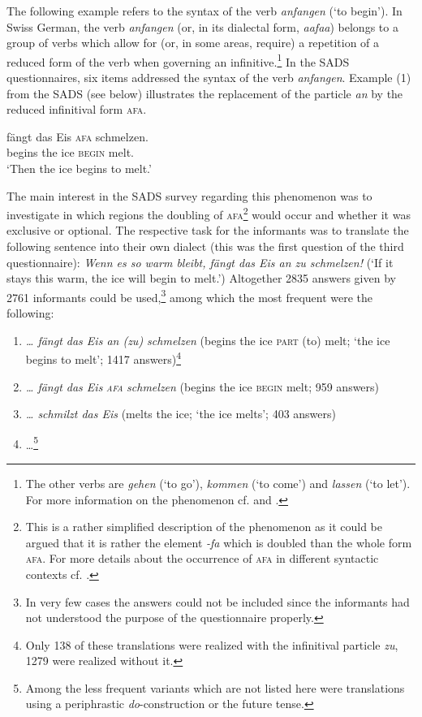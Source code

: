 \documentclass[output=paper]{LSP/langsci}
\begin{document}
The following example refers to the syntax of the verb \emph{anfangen} (‘to begin’). In Swiss German, the verb \emph{anfangen} (or, in its dialectal form, \emph{aafaa}) belongs to a group of verbs which allow for (or, in some areas, require) a repetition of a reduced form of the verb when governing an infinitive.\footnote{The other verbs are \emph{gehen} (‘to go’), \emph{kommen} (‘to come’) and \emph{lassen} (‘to let’). For more information on the phenomenon cf. \citet{glaser_empirische_2011} and \citet{lotscher_zur_1993}.} In the SADS questionnaires, six items addressed the syntax of the verb \emph{anfangen}. Example (1) from the SADS (see below) illustrates the replacement of the particle \emph{an} by the reduced infinitival form \textsc{afa}.

\ea %
\label{ex:stoeck:1}
\gll [dann]  fängt  das Eis  \textsc{afa} schmelzen.\\
[then]    begins  the ice    \textsc{begin}  melt.	\\
\glt `Then the ice begins to melt.'
\z

The main interest in the SADS survey regarding this phenomenon was to investigate in which regions the doubling of \textsc{afa}\footnote{ This is a rather simplified description of the phenomenon as it could be argued that it is rather the element \emph{{}-fa} which is doubled than the whole form \textsc{afa}. For more details about the occurrence of \textsc{afa} in different syntactic contexts cf. \citet{andres_verdoppelung_2011}.} would occur and whether it was exclusive or optional. The respective task for the informants was to translate the following sentence into their own dialect (this was the first question of the third questionnaire):
\vskip11pt
\emph{Wenn es so warm bleibt, fängt das Eis an zu schmelzen!} (‘If it stays this warm, the ice will begin to melt.’)
\vskip11pt
Altogether 2835 answers given by 2761 informants could be used,\footnote{In very few cases the answers could not be included since the informants had not understood the purpose of the questionnaire properly.} among which the most frequent were the following:

\begin{enumerate}
\item \emph{… fängt das Eis an (zu) schmelzen} (begins the ice \textsc{part} (to) melt; ‘the ice begins to melt’; 1417 answers)\footnote{ Only 138 of these translations were realized with the infinitival particle \emph{zu}, 1279 were realized without it.}

\item \emph{… fängt das Eis }\emph{\textsc{afa}}\emph{ schmelzen} (begins the ice \textsc{begin} melt; 959 answers)

\item \emph{… schmilzt das Eis} (melts the ice; ‘the ice melts’; 403 answers)

\item …\footnote{Among the less frequent variants which are not listed here were translations using a periphrastic \emph{do}{}-construction or the future tense.}
\end{enumerate}
\end{document}
